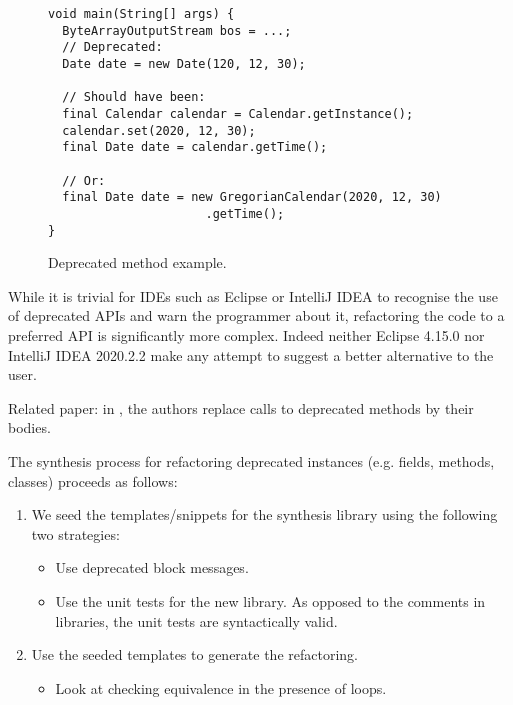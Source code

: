 \documentclass[runningheads,a4paper]{llncs}
\begin{document}
\begin{figure}
\begin{lstlisting}[mathescape=true,showstringspaces=false]
void main(String[] args) {
  ByteArrayOutputStream bos = ...;
  // Deprecated:
  Date date = new Date(120, 12, 30);

  // Should have been:
  final Calendar calendar = Calendar.getInstance();
  calendar.set(2020, 12, 30);
  final Date date = calendar.getTime();

  // Or:
  final Date date = new GregorianCalendar(2020, 12, 30)
                      .getTime();
}
\end{lstlisting}
\caption{Deprecated method example.}
\label{ex:deprecated-method}
\end{figure}

While it is trivial for IDEs such as Eclipse or IntelliJ IDEA to recognise the
use of deprecated APIs and warn the programmer about it, refactoring the code to
a preferred API is significantly more complex. Indeed neither Eclipse 4.15.0 nor
IntelliJ IDEA 2020.2.2 make any attempt to suggest a better alternative to the
user.


Related paper: in \cite{DBLP:conf/paste/Perkins05}, the authors
replace calls to deprecated methods by their bodies.


The synthesis process for refactoring deprecated instances (e.g. fields, methods, classes) proceeds as follows:
\begin{enumerate}
\item We seed the templates/snippets for the synthesis library using the following two strategies:
  \begin{itemize}
\item Use deprecated block messages.
\item Use the unit tests for the new library. As opposed to the comments in libraries,
  the unit tests are syntactically valid.
  \end{itemize}

\item Use the seeded templates to generate the refactoring.
  \begin{itemize}
\item Look at checking equivalence in the presence of loops.
  \end{itemize}
  \end{enumerate}
\end{document}
